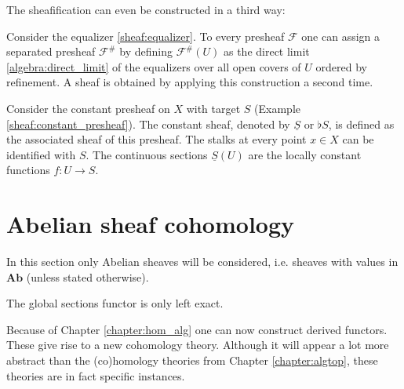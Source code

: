 
    The sheafification can even be constructed in a third way:
    \begin{construct}\label{sheaf:colimit_construction}
        Consider the equalizer \eqref{sheaf:equalizer}. To every presheaf $\mathcal{F}$ one can assign a separated presheaf $\mathcal{F}^\#$ by defining $\mathcal{F}^\#(U)$ as the direct limit \ref{algebra:direct_limit} of the equalizers over all open covers of $U$ ordered by refinement. A sheaf is obtained by applying this construction a second time.
    \end{construct}

    \begin{example}\label{sheaf:constant_sheaf}
        Consider the constant presheaf on $X$ with target $S$ (Example \ref{sheaf:constant_presheaf}). The constant sheaf, denoted by $\underline{S}$ or $\flat S$, is defined as the associated sheaf of this presheaf. The stalks at every point $x\in X$ can be identified with $S$. The continuous sections $\underline{S}(U)$ are the locally constant functions $f:U\rightarrow S$.
    \end{example}

\section{Abelian sheaf cohomology}

    In this section only Abelian sheaves will be considered, i.e. sheaves with values in $\mathbf{Ab}$ (unless stated otherwise).

    \begin{property}\label{sheaf:left_exact_functor}
        The global sections functor is only left exact.
    \end{property}
    Because of Chapter \ref{chapter:hom_alg} one can now construct derived functors. These give rise to a new cohomology theory. Although it will appear a lot more abstract than the (co)homology theories from Chapter \ref{chapter:algtop}, these theories are in fact specific instances.

